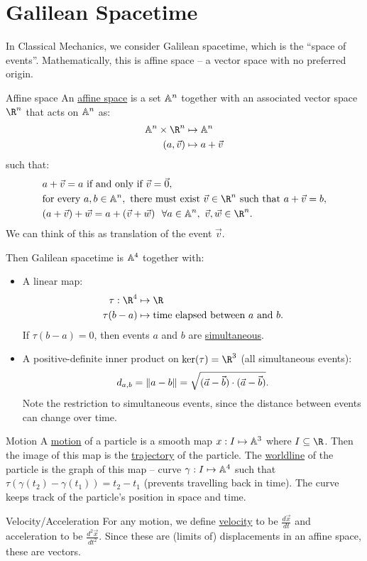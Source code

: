 \documentclass[../Main.tex]{subfiles}
\begin{document}
\section{Galilean Spacetime}
In Classical Mechanics, we consider Galilean spacetime, which is the ``space of events''. Mathematically, this is affine space -- a vector space with no preferred origin.
\begin{definition}{Affine space}
    An \underline{affine space} is a set $\mathbb{A}^n$ together with an associated vector space $\R^n$ that acts on $\mathbb{A}^n$ as:
    \begin{align*}
        \A^n \times \R^n &\mapsto \A^n\\
        (a, \vec{v}) &\mapsto a + \vec{v}
    \end{align*}
    such that:
    \begin{align*}
        &a + \vec{v} = a \text{ if and only if } \vec{v} = \vec{0}, \\
        &\text{for every } a, b \in \A^n, \text{ there must exist } \vec{v} \in \R^n \text{ such that } a + \vec{v} = b, \\
        &(a + \vec{v}) + \vec{w} = a + (\vec{v} + \vec{w})~~\forall a \in \A^n,~\vec{v}, \vec{w} \in \R^n.
    \end{align*}
    We can think of this as translation of the event $\vec{v}$.
\end{definition}
Then Galilean spacetime is $\mathbb{A}^4$ together with:
\begin{itemize}
    \item A linear map:
        \begin{align*}
            \tau : \R^4 &\mapsto \R\\
            \tau(b-a) &\mapsto \text{time elapsed between $a$ and $b$.}
        \end{align*}
        If $\tau(b-a) = 0$, then events $a$ and $b$ are \underline{simultaneous}.
    \item A positive-definite inner product on $\ker(\tau) = \R^3$ (all simultaneous events):
        \begin{equation*}
            d_{a, b} = \left\|a - b\right\| = \sqrt{(\vec{a} - \vec{b}) \cdot (\vec{a} - \vec{b})}.
        \end{equation*}
        Note the restriction to simultaneous events, since the distance between events can change over time.
\end{itemize}
\begin{definition}{Motion}
    A \underline{motion} of a particle is a smooth map $x : I \mapsto \mathbb{A}^3$ where $I \subseteq \R$. Then the image of this map is the \underline{trajectory} of the particle. The \underline{worldline} of the particle is the graph of this map -- curve $\gamma : I \mapsto \mathbb{A}^4$ such that $\tau(\gamma(t_2) - \gamma(t_1)) = t_2 - t_1$ (prevents travelling back in time). The curve keeps track of the particle's position in space and time.
\end{definition}
\begin{definition}{Velocity/Acceleration}
    For any motion, we define \underline{velocity} to be $\frac{d\vec{x}}{dt}$ and acceleration to be $\frac{d^{2}\vec{x}}{dt^{2}}$. Since these are (limits of) displacements in an affine space, these are vectors.
\end{definition}
\end{document}
